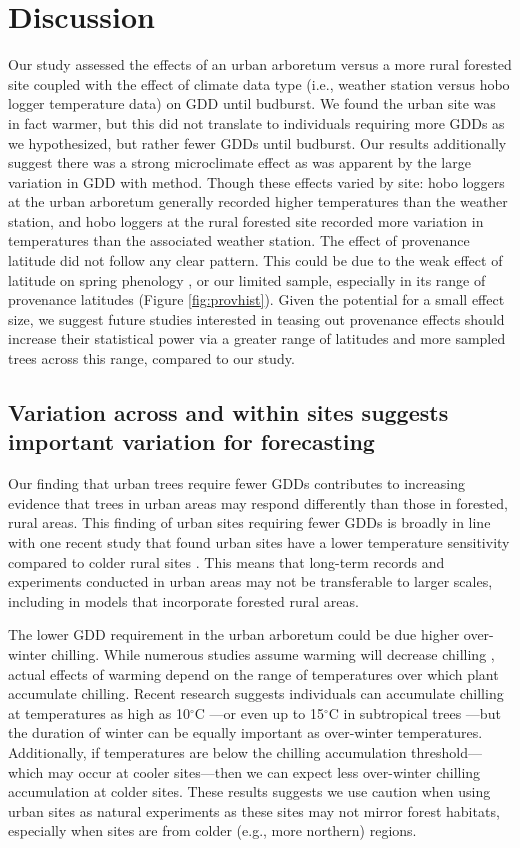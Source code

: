 \documentclass{article}\usepackage[]{graphicx}\usepackage[]{color}
\begin{document}
\section*{Discussion} 
Our study assessed the effects of an urban arboretum versus a more rural forested site coupled with the effect of climate data type (i.e., weather station versus hobo logger temperature data) on GDD until budburst. We found the urban site was in fact warmer, but this did not translate to individuals requiring more GDDs as we hypothesized, but rather fewer GDDs until budburst. Our results additionally suggest there was a strong microclimate effect as was apparent by the large variation in GDD with method. Though these effects varied by site: hobo loggers at the urban arboretum generally recorded higher temperatures than the weather station, and hobo loggers at the rural forested site recorded more variation in temperatures than the associated weather station. The effect of provenance latitude did not follow any clear pattern. This could be due to the weak effect of latitude on spring phenology \citep{Gauzere2017}, or our limited sample, especially in its range of provenance latitudes (Figure \ref{fig:provhist}). Given the potential for a small effect size, we suggest future studies interested in teasing out provenance effects should increase their statistical power via a greater range of latitudes and more sampled trees across this range, compared to our study. 

\subsection*{Variation across and within sites suggests important variation for forecasting} 
Our finding that urban trees require fewer GDDs contributes to increasing evidence that trees in urban areas may respond differently than those in forested, rural areas. This finding of urban sites requiring fewer GDDs is broadly in line with one recent study that found urban sites have a lower temperature sensitivity compared to colder rural sites \citep{Meng2020}. This means that long-term records and experiments conducted in urban areas may not be transferable to larger scales, including in models that incorporate forested rural areas. 

The lower GDD requirement in the urban arboretum could be due higher over-winter chilling. While numerous studies assume warming will decrease chilling \citep{Luedeling2011,Fu2015,Asse2018}, actual effects of warming depend on the range of temperatures over which plant accumulate chilling. Recent research suggests individuals can accumulate chilling at temperatures as high as 10$^{\circ}$C \citep{Baumgarten2021}---or even up to 15$^{\circ}$C in subtropical trees \citep{Zhang2021}---but the duration of winter can be equally important as over-winter temperatures. Additionally, if temperatures are below the chilling accumulation threshold---which may occur at cooler sites---then we can expect less over-winter chilling accumulation at colder sites. These results suggests we use caution when using urban sites as natural experiments as these sites may not mirror forest habitats, especially when sites are from colder (e.g., more northern) regions.
\end{document}
